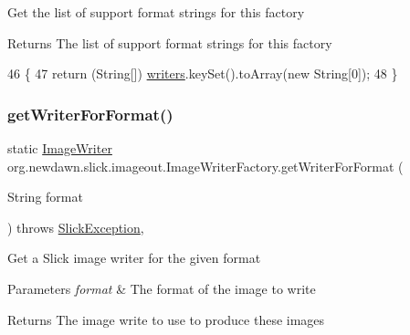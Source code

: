 Get the list of support format strings for this factory

\begin{DoxyReturn}{Returns}
The list of support format strings for this factory 
\end{DoxyReturn}

\begin{DoxyCode}
46                                                  \{
47         \textcolor{keywordflow}{return} (String[]) \mbox{\hyperlink{classorg_1_1newdawn_1_1slick_1_1imageout_1_1_image_writer_factory_a93deff6a9953d95273a8a2a50520318d}{writers}}.keySet().toArray(\textcolor{keyword}{new} String[0]);
48     \}
\end{DoxyCode}
\mbox{\label{classorg_1_1newdawn_1_1slick_1_1imageout_1_1_image_writer_factory_aaf5d5c5091ad1514a9610313253757cb}} 
\subsubsection{\texorpdfstring{get\+Writer\+For\+Format()}{getWriterForFormat()}}
{\footnotesize\ttfamily static \mbox{\hyperlink{interfaceorg_1_1newdawn_1_1slick_1_1imageout_1_1_image_writer}{Image\+Writer}} org.\+newdawn.\+slick.\+imageout.\+Image\+Writer\+Factory.\+get\+Writer\+For\+Format (\begin{DoxyParamCaption}\item[{String}]{format }\end{DoxyParamCaption}) throws \mbox{\hyperlink{classorg_1_1newdawn_1_1slick_1_1_slick_exception}{Slick\+Exception}}\hspace{0.3cm}{\ttfamily [inline]}, {\ttfamily [static]}}

Get a Slick image writer for the given format


\begin{DoxyParams}{Parameters}
{\em format} & The format of the image to write \\
\hline
\end{DoxyParams}
\begin{DoxyReturn}{Returns}
The image write to use to produce these images 
\end{DoxyReturn}

